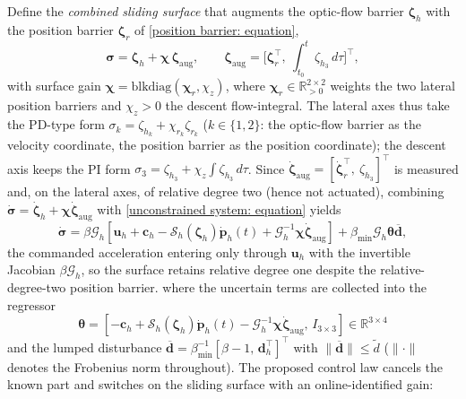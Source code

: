 Define the \emph{combined sliding surface} that augments the optic-flow barrier $\boldsymbol{\zeta}_h$ with the position barrier $\boldsymbol{\zeta}_r$ of \eqref{position barrier: equation},
\begin{equation} \label{sliding surface: equation}
    \boldsymbol{\sigma} = \boldsymbol{\zeta}_h + \boldsymbol{\chi}\,\boldsymbol{\zeta}_\text{aug},\qquad \boldsymbol{\zeta}_\text{aug}=\Big[\boldsymbol{\zeta}_r^\top,\ \textstyle\int_{t_0}^{t}\zeta_{h_3}\,d\tau\Big]^\top,
\end{equation}
with surface gain $\boldsymbol{\chi}=\text{blkdiag}(\boldsymbol{\chi}_r,\chi_z)$, where $\boldsymbol{\chi}_r\in\mathbb{R}^{2\times2}_{>0}$ weights the two lateral position barriers and $\chi_z>0$ the descent flow-integral. The lateral axes thus take the PD-type form $\sigma_k=\zeta_{h_k}+\chi_{r_k}\zeta_{r_k}$ ($k\in\{1,2\}$: the optic-flow barrier as the velocity coordinate, the position barrier as the position coordinate); the descent axis keeps the PI form $\sigma_3=\zeta_{h_3}+\chi_z\!\int\zeta_{h_3}\,d\tau$. Since $\dot{\boldsymbol{\zeta}}_\text{aug}=[\dot{\boldsymbol{\zeta}}_r^\top,\ \zeta_{h_3}]^\top$ is measured and, on the lateral axes, of relative degree two (hence not actuated), combining $\dot{\boldsymbol{\sigma}}=\dot{\boldsymbol{\zeta}}_h+\boldsymbol{\chi}\dot{\boldsymbol{\zeta}}_\text{aug}$ with \eqref{unconstrained system: equation} yields
\begin{equation} \label{sigma derivative: equation 2}
    \dot{\boldsymbol{\sigma}} = \beta\mathcal{G}_h\!\left[\boldsymbol{u}_h+\boldsymbol{c}_h-\mathcal{S}_h(\boldsymbol{\zeta}_h)\dot{\boldsymbol{p}}_h(t)+\mathcal{G}_h^{-1}\boldsymbol{\chi}\dot{\boldsymbol{\zeta}}_\text{aug}\right] + \beta_{\min}\mathcal{G}_h\boldsymbol{\theta}\boldsymbol{\overline{d}},
\end{equation}
the commanded acceleration entering only through $\boldsymbol{u}_h$ with the invertible Jacobian $\beta\mathcal{G}_h$, so the surface retains relative degree one despite the relative-degree-two position barrier.
where the uncertain terms are collected into the regressor
\begin{equation} \label{regressor: equation}
    \boldsymbol{\theta} = [-\boldsymbol{c}_h+\mathcal{S}_h(\boldsymbol{\zeta}_h)\dot{\boldsymbol{p}}_h(t)-\mathcal{G}_h^{-1}\boldsymbol{\chi}\dot{\boldsymbol{\zeta}}_\text{aug},\,I_{3\times 3}]\in\mathbb{R}^{3\times 4}
\end{equation}
and the lumped disturbance $\boldsymbol{\overline{d}}=\beta_{\min}^{-1}[\beta-1,\,\boldsymbol{d}_h^\top]^\top$ with $\|\boldsymbol{\overline{d}}\|\le\tilde{d}$ ($\|\cdot\|$ denotes the Frobenius norm throughout). The proposed control law cancels the known part and switches on the sliding surface with an online-identified gain:
